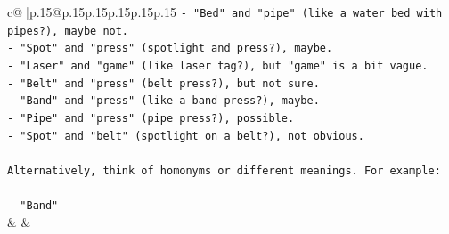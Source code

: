 \documentclass{article}
\begin{document}
{\begin{supertabular}{c@{$\;$}|p{.15\linewidth}@{}p{.15\linewidth}p{.15\linewidth}p{.15\linewidth}p{.15\linewidth}p{.15\linewidth}}
{{{\texttt{{-} "Bed" and "pipe" (like a water bed with pipes?), maybe not.} \\
\texttt{{-} "Spot" and "press" (spotlight and press?), maybe.} \\
\texttt{{-} "Laser" and "game" (like laser tag?), but "game" is a bit vague.} \\
\texttt{{-} "Belt" and "press" (belt press?), but not sure.} \\
\texttt{{-} "Band" and "press" (like a band press?), maybe.} \\
\texttt{{-} "Pipe" and "press" (pipe press?), possible.} \\
\texttt{{-} "Spot" and "belt" (spotlight on a belt?), not obvious.} \\
\\ 
\texttt{Alternatively, think of homonyms or different meanings. For example:} \\
\\ 
\texttt{{-} "Band"} \\
            }
        }
    }
    & & \\ \\


\end{supertabular}}
\end{document}
